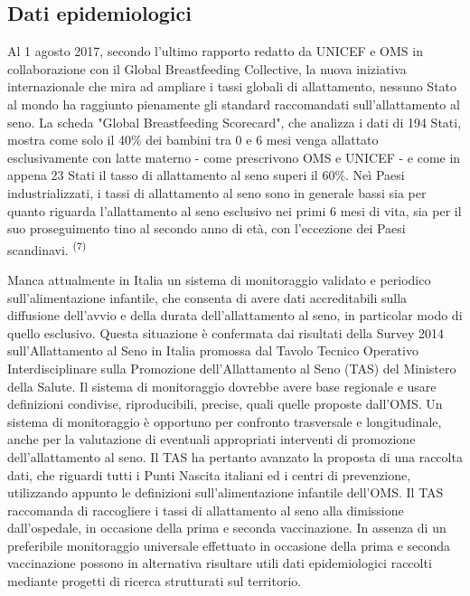 \documentclass[]{article}
\begin{document}
\hypertarget{dati-epidemiologici}{%
\subsection{Dati epidemiologici}\label{dati-epidemiologici}}

Al 1 agosto 2017, secondo l'ultimo rapporto redatto da UNICEF e OMS in
collaborazione con il Global Breastfeeding Collective, la nuova
iniziativa internazionale che mira ad ampliare i tassi globali di
allattamento, nessuno Stato al mondo ha raggiunto pienamente gli
standard raccomandati sull'allattamento al seno. La scheda "Global
Breastfeeding Scorecard", che analizza i dati di 194 Stati, mostra come
solo il 40\% dei bambini tra 0 e 6 mesi venga allattato esclusivamente
con latte materno - come prescrivono OMS e UNICEF - e come in appena 23
Stati il tasso di allattamento al seno superi il 60\%. Neì Paesi
industrializzati, i tassi di allattamento al seno sono in generale bassi
sia per quanto riguarda l'allattamento al seno esclusivo nei primi 6
mesi di vita, sia per il suo proseguimento tino al secondo anno di età,
con l'eccezione dei Paesi scandinavi. \textsuperscript{(7)}

Manca attualmente in Italia un sistema di monitoraggio validato e
periodico sull'alimentazione infantile, che consenta di avere dati
accreditabili sulla diffusione dell'avvio e della durata
dell'allattamento al seno, in particolar modo di quello esclusivo.
Questa situazione è confermata dai risultati della Survey 2014
sull'Allattamento al Seno in Italia promossa dal Tavolo Tecnico
Operativo Interdisciplinare sulla Promozione dell'Allattamento al Seno
(TAS) del Ministero della Salute. Il sistema di monitoraggio dovrebbe
avere base regionale e usare definizioni condivise, riproducibili,
precise, quali quelle proposte dall'OMS. Un sistema di monitoraggio è
opportuno per confronto trasversale e longitudinale, anche per la
valutazione di eventuali appropriati interventi di promozione
dell'allattamento al seno. Il TAS ha pertanto avanzato la proposta di
una raccolta dati, che riguardi tutti i Punti Nascita italiani ed i
centri di prevenzione, utilizzando appunto le definizioni
sull'alimentazione infantile dell'OMS. Il TAS raccomanda di raccogliere
i tassi di allattamento al seno alla dimissione dall'ospedale, in
occasione della prima e seconda vaccinazione. In assenza di un
preferibile monitoraggio universale effettuato in occasione della prima
e seconda vaccinazione possono in alternativa risultare utili dati
epidemiologici raccolti mediante progetti di ricerca strutturati sul
territorio.
\end{document}
